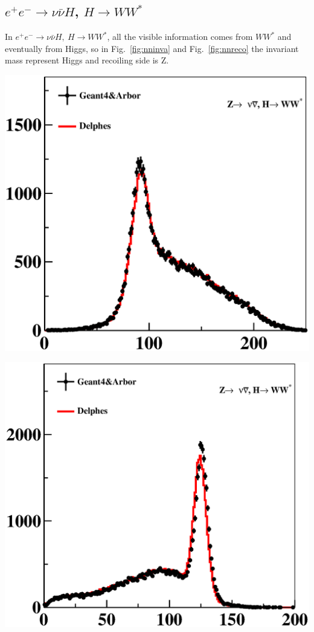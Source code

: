 \documentclass[a4paper,10pt,twoside]{cpc-hepnp}
\begin{document}
\subsection{$e^+e^-\to \nu\bar{\nu}H$, $H \to WW^*$} 
In $e^+e^- \to \nu\bar{\nu}H,~H\to WW^*$,  all the visible information comes from $WW^*$ and eventually from Higgs, so in Fig.~\ref{fig:nninva} and Fig.~\ref{fig:nnreco} the invariant mass represent Higgs and recoiling side is Z.


\begin{center}
\includegraphics[width=0.9\linewidth]{nnh_reco}
\end{center}
\begin{center}
\includegraphics[width=0.9\linewidth]{nnh_mass}
\end{center}
\end{document}
